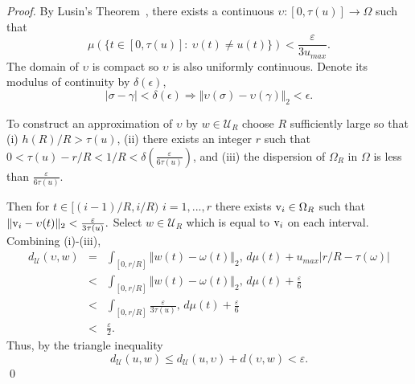 \documentclass{llncs}
\begin{document}
\begin{proof}

By Lusin's Theorem~\cite[pg. 41]{kolmogorov1961elements}, there exists
a continuous $\upsilon:[0,\tau(u)]\rightarrow\Omega$ such that 
\begin{equation}
\mu(\{t\in[0,\tau(u)]:\:\upsilon(t)\neq u(t)\})<\frac{\varepsilon}{3u_{max}}.
\end{equation}
The domain of $\upsilon$ is compact so $\upsilon$ is also uniformly continuous. Denote its modulus of continuity by $\delta(\epsilon)$,
\begin{equation}
|\sigma-\gamma|<\delta(\epsilon)\Rightarrow\Vert\upsilon(\sigma)-\upsilon(\gamma)\Vert_{2}<\epsilon.
\end{equation}


To construct an approximation of $\upsilon$ by $w\in\mathcal{U}_{R}$
choose $R$ sufficiently large so that (i) $h(R)/R>\tau(u)$,
(ii) there exists an integer $r$ such that $0<\tau(u)-r/R<1/R<\delta\left(\frac{\varepsilon}{6\tau(u)}\right)$,
and (iii) the dispersion of $\Omega_{R}$ in $\Omega$ is less than $\frac{\varepsilon}{6\tau(u)}$. 

Then for $t\in[(i-1)/R,i/R)$ $i=1,...,r$ there exists ${\rm v}_{i}\in\Omega_{R}$
such that $\Vert {\rm v}_{i}-\upsilon(t)\Vert_{2}<\frac{\varepsilon}{3\tau(u)}.$
Select $w\in\mathcal{U}_{R}$ which is equal to ${\rm v}_{i}$ on
each interval. Combining (i)-(iii), 
\begin{equation}
\begin{array}{rcl}
d_{\mathcal{U}}(\upsilon,w) & = & \int_{[0,r/R]}\Vert w(t)-\omega(t)\Vert_{2},\, d\mu(t)+u_{max}|r/R-\tau(\omega)|\\
 & < & \int_{[0,r/R]}\Vert w(t)-\omega(t)\Vert_{2},\, d\mu(t)+\frac{\varepsilon}{6}\\
 & < & \int_{[0,r/R]}\frac{\varepsilon}{3\tau(u)},\, d\mu(t)+\frac{\varepsilon}{6}\\
 & < & \frac{\varepsilon}{2}.
\end{array}
\end{equation}
Thus, by the triangle inequality
\begin{equation}
d_{\mathcal{U}}(u,w)\leq d_{\mathcal{U}}(u,\upsilon)+d(\upsilon,w)<\varepsilon.
\end{equation}
\qed
\end{proof}
\end{document}
